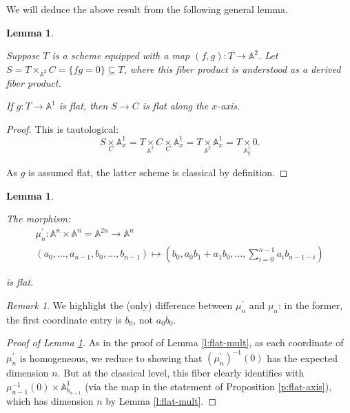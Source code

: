 \documentclass[reqno,11pt]{amsart}
\numberwithin{equation}{subsection}
\newtheorem{lem}[thm]{Lemma}
\theoremstyle{remark}
\newtheorem{rem}[thm]{Remark}
\newcommand{\bA}{{\mathbb A}}
\renewcommand{\subset}{\subseteq}
\begin{document}
We will deduce the above result from the following general lemma.

\begin{lem}\label{l:genl-flat-axes}

Suppose $T$ is a scheme equipped with a map $(f,g):T \to \bA^2$.
Let $S = T \times_{\bA^2} C = \{fg = 0\} \subset T$, where this fiber
product is understood as a derived fiber product.

If $g:T \to \bA^1$ is flat, then $S \to C$ is flat along the $x$-axis.

\end{lem}

\begin{proof}

This is tautological:
%
\[
S \underset{C}{\times} \bA_x^1 = 
T \underset{\bA^2}{\times} C \underset{C}{\times} \bA_x^1 = 
T \underset{\bA^2}{\times} \bA_x^1 = 
T \underset{\bA_y^1}{\times} 0.
\]

\noindent As $g$ is assumed flat, 
the latter scheme is classical by definition.

\end{proof}

\begin{lem}\label{l:pre-axes}

The morphism:
%
\[
\begin{gathered}
\mu_n^{\prime}:\bA^n \times \bA^n = \bA^{2n} \to \bA^n \\
(a_0,\ldots,a_{n-1},b_0,\ldots,b_{n-1}) \mapsto 
(b_0,a_0b_1+a_1b_0,\ldots,\sum_{i = 0}^{n-1} a_ib_{n-1-i})
\end{gathered}
\]

\noindent is flat. 

\end{lem}

\begin{rem}

We highlight the (only) difference between $\mu_n^{\prime}$ and
$\mu_n$:
in the former, the first coordinate entry is $b_0$, not $a_0b_0$. 

\end{rem}

\begin{proof}[Proof of Lemma \ref{l:pre-axes}]

As in the proof of Lemma \ref{l:flat-mult}, 
as each coordinate of $\mu_n^{\prime}$ is homogeneous, we
reduce to showing that $(\mu_n^{\prime})^{-1}(0)$ has the expected
dimension $n$. But at the classical level, 
this fiber clearly identifies with 
$\mu_{n-1}^{-1}(0) \times \bA_{b_{n-1}}^1$ (via the map in the statement
of Proposition \ref{p:flat-axis}),
which has dimension $n$ by Lemma \ref{l:flat-mult}.

\end{proof}
\end{document}
